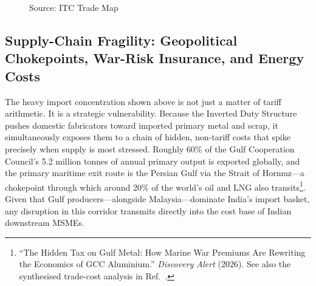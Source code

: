 \documentclass[11pt, a4paper]{article}
\numberwithin{figure}{section}
\numberwithin{table}{section}
\begin{document}
\begin{figure}[H]
{%
    }

    \vspace{1.5cm}
    \raggedright
    Source: ITC Trade Map
\end{figure}

\subsection{Supply-Chain Fragility: Geopolitical Chokepoints, War-Risk Insurance, and Energy Costs}
The heavy import concentration shown above is not just a matter of tariff arithmetic. It is a strategic vulnerability. Because the Inverted Duty Structure pushes domestic fabricators toward imported primary metal and scrap, it simultaneously exposes them to a chain of hidden, non-tariff costs that spike precisely when supply is most stressed. Roughly 60\% of the Gulf Cooperation Council's 5.2 million tonnes of annual primary output is exported globally, and the primary maritime exit route is the Persian Gulf via the Strait of Hormuz—a chokepoint through which around 20\% of the world's oil and LNG also transits\footnote{``The Hidden Tax on Gulf Metal: How Marine War Premiums Are Rewriting the Economics of GCC Aluminium.'' \textit{Discovery Alert} (2026). See also the synthesised trade-cost analysis in Ref.~\cite{costreg2026}.}. Given that Gulf producers—alongside Malaysia—dominate India's import basket, any disruption in this corridor transmits directly into the cost base of Indian downstream MSMEs.
\end{document}
